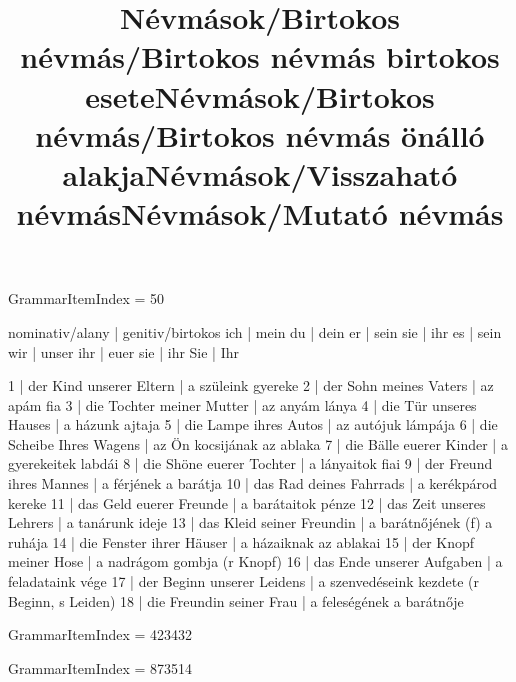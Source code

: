 \title{Névmások/Birtokos névmás/Birtokos névmás birtokos esete}

GrammarItemIndex = 50

\begin{desc}
nominativ/alany | genitiv/birtokos 
ich             | mein
du              | dein
er              | sein
sie             | ihr
es              | sein
wir             | unser
ihr             | euer
sie             | ihr
Sie             | Ihr
\end{desc}

\begin{exmp}
1 | der Kind unserer Eltern | a szüleink gyereke
2 | der Sohn meines Vaters | az apám fia
3 | die Tochter meiner Mutter | az anyám lánya
4 | die Tür unseres Hauses | a házunk ajtaja
5 | die Lampe ihres Autos | az autójuk lámpája
6 | die Scheibe Ihres Wagens | az Ön kocsijának az ablaka
7 | die Bälle euerer Kinder | a gyerekeitek labdái
8 | die Shöne euerer Tochter | a lányaitok fiai
9 | der Freund ihres Mannes | a férjének a barátja
10 | das Rad deines Fahrrads | a kerékpárod kereke
11 | das Geld euerer Freunde | a barátaitok pénze
12 | das Zeit unseres Lehrers | a tanárunk ideje
13 | das Kleid seiner Freundin | a barátnőjének (f) a ruhája
14 | die Fenster ihrer Häuser | a házaiknak az ablakai
15 | der Knopf meiner Hose | a nadrágom gombja (r Knopf)
16 | das Ende unserer Aufgaben | a feladataink vége
17 | der Beginn unserer Leidens | a szenvedéseink kezdete (r Beginn, s Leiden)
18 | die Freundin seiner Frau | a feleségének a barátnője
\end{exmp}

\title{Névmások/Birtokos névmás/Birtokos névmás önálló alakja}

GrammarItemIndex = 423432

\begin{desc}
\end{desc}

\begin{exmp}
\end{exmp}

\title{Névmások/Visszaható névmás}

GrammarItemIndex = 873514

\begin{desc}
\end{desc}

\begin{exmp}
\end{exmp}

\title{Névmások/Mutató névmás}

